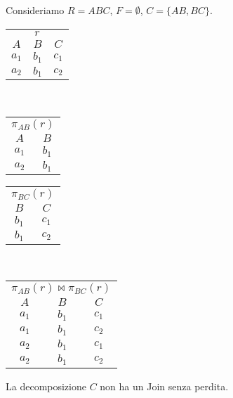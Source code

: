 \begin{exmp}
Consideriamo $R = ABC$, $F = \emptyset$, $C = \{AB, BC\}$.

\begin{center}
\begin{tabular}{*{3}{c}}
\multicolumn{3}{c}{$r$} \\ 
$A$ & $B$ & $C$ \\
\hline
$a_1$ & $b_1$ & $c_1$ \\
$a_2$ & $b_1$ & $c_2$
\end{tabular}
\\
\begin{tabular}{*{2}{c}}
\multicolumn{2}{c}{$\pi_{AB} (r)$} \\
$A$ & $B$ \\
\hline
$a_1$ & $b_1$ \\
$a_2$ & $b_1$
\end{tabular}
\qquad
\begin{tabular}{*{2}{c}}
\multicolumn{2}{c}{$\pi_{BC} (r)$} \\
$B$ & $C$ \\
\hline
$b_1$ & $c_1$ \\
$b_1$ & $c_2$
\end{tabular}
\\
\begin{tabular}{*{3}{c}}
\multicolumn{3}{c}{$\pi_{AB} (r) \Join \pi_{BC} (r)$} \\
$A$ & $B$ & $C$ \\
\hline
$a_1$ & $b_1$ & $c_1$ \\
$a_1$ & $b_1$ & $c_2$ \\
$a_2$ & $b_1$ & $c_1$ \\
$a_2$ & $b_1$ & $c_2$
\end{tabular}
\end{center}

La decomposizione $C$ non ha un Join senza perdita.
\end{exmp}

